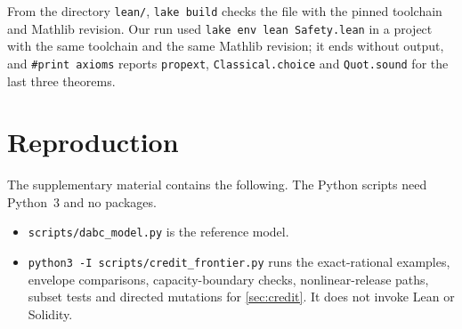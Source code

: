 From the directory \texttt{lean/}, \texttt{lake build} checks the file with the pinned toolchain and Mathlib revision. Our run used \texttt{lake env lean Safety.lean} in a project with the same toolchain and the same Mathlib revision; it ends without output, and \texttt{\#print axioms} reports \texttt{propext}, \texttt{Classical.choice} and \texttt{Quot.sound} for the last three theorems.

\section{Reproduction}\label{app:repro}

The supplementary material contains the following. \artifactlocation{} The Python scripts need Python~3 and no packages.

\begin{sloppypar}
\begin{itemize}
\item \texttt{scripts/dabc\_model.py} is the reference model.
\item \texttt{python3 -I scripts/credit\_frontier.py} runs the exact-rational examples, envelope comparisons, capacity-boundary checks, nonlinear-release paths, subset tests and directed mutations for \cref{sec:credit}. It does not invoke Lean or Solidity.


\end{itemize}
\end{sloppypar}
